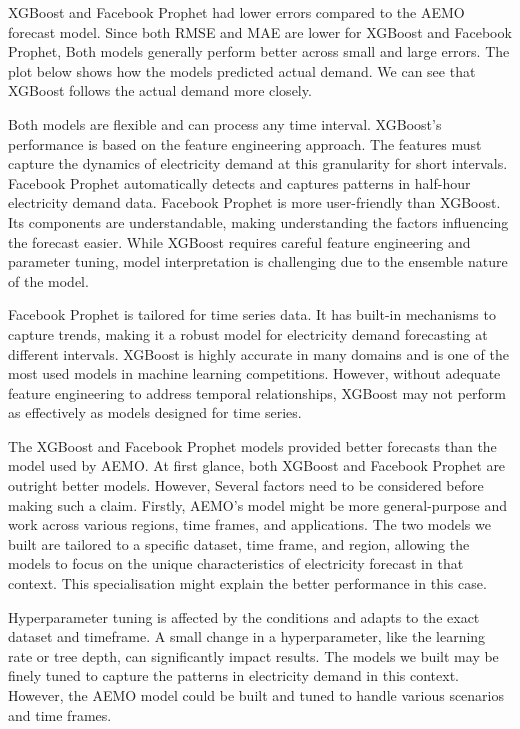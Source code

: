 \documentclass[mstat,12pt]{unswthesis}
\begin{document}
XGBoost and Facebook Prophet had lower errors compared to the AEMO
forecast model. Since both RMSE and MAE are lower for XGBoost and
Facebook Prophet, Both models generally perform better across small and
large errors. The plot below shows how the models predicted actual
demand. We can see that XGBoost follows the actual demand more closely.

Both models are flexible and can process any time interval. XGBoost's
performance is based on the feature engineering approach. The features
must capture the dynamics of electricity demand at this granularity for
short intervals. Facebook Prophet automatically detects and captures
patterns in half-hour electricity demand data. Facebook Prophet is more
user-friendly than XGBoost. Its components are understandable, making
understanding the factors influencing the forecast easier. While XGBoost
requires careful feature engineering and parameter tuning, model
interpretation is challenging due to the ensemble nature of the model.

Facebook Prophet is tailored for time series data. It has built-in
mechanisms to capture trends, making it a robust model for electricity
demand forecasting at different intervals. XGBoost is highly accurate in
many domains and is one of the most used models in machine learning
competitions. However, without adequate feature engineering to address
temporal relationships, XGBoost may not perform as effectively as models
designed for time series.

The XGBoost and Facebook Prophet models provided better forecasts than
the model used by AEMO. At first glance, both XGBoost and Facebook
Prophet are outright better models. However, Several factors need to be
considered before making such a claim. Firstly, AEMO's model might be
more general-purpose and work across various regions, time frames, and
applications. The two models we built are tailored to a specific
dataset, time frame, and region, allowing the models to focus on the
unique characteristics of electricity forecast in that context. This
specialisation might explain the better performance in this case.

Hyperparameter tuning is affected by the conditions and adapts to the
exact dataset and timeframe. A small change in a hyperparameter, like
the learning rate or tree depth, can significantly impact results. The
models we built may be finely tuned to capture the patterns in
electricity demand in this context. However, the AEMO model could be
built and tuned to handle various scenarios and time frames.
\end{document}

